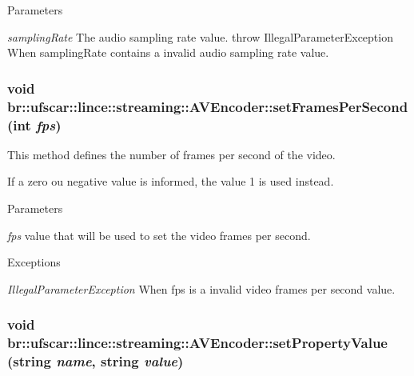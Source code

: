 \begin{DoxyParams}{Parameters}
\item[{\em samplingRate}]The audio sampling rate value. throw IllegalParameterException When samplingRate contains a invalid audio sampling rate value. \end{DoxyParams}
\hypertarget{classbr_1_1ufscar_1_1lince_1_1streaming_1_1AVEncoder_a14ea51da6bf535ab411677a5500e209c}{
\subsubsection[{setFramesPerSecond}]{\setlength{\rightskip}{0pt plus 5cm}void br::ufscar::lince::streaming::AVEncoder::setFramesPerSecond (int {\em fps})}}
\label{classbr_1_1ufscar_1_1lince_1_1streaming_1_1AVEncoder_a14ea51da6bf535ab411677a5500e209c}


This method defines the number of frames per second of the video. 

If a zero ou negative value is informed, the value 1 is used instead. 
\begin{DoxyParams}{Parameters}
\item[{\em fps}]value that will be used to set the video frames per second. \end{DoxyParams}

\begin{DoxyExceptions}{Exceptions}
\item[{\em IllegalParameterException}]When fps is a invalid video frames per second value. \end{DoxyExceptions}
\hypertarget{classbr_1_1ufscar_1_1lince_1_1streaming_1_1AVEncoder_a73a3b4824163ded2d49dc1e10f8b03d1}{
\subsubsection[{setPropertyValue}]{\setlength{\rightskip}{0pt plus 5cm}void br::ufscar::lince::streaming::AVEncoder::setPropertyValue (string {\em name}, \/  string {\em value})}}
\label{classbr_1_1ufscar_1_1lince_1_1streaming_1_1AVEncoder_a73a3b4824163ded2d49dc1e10f8b03d1}


